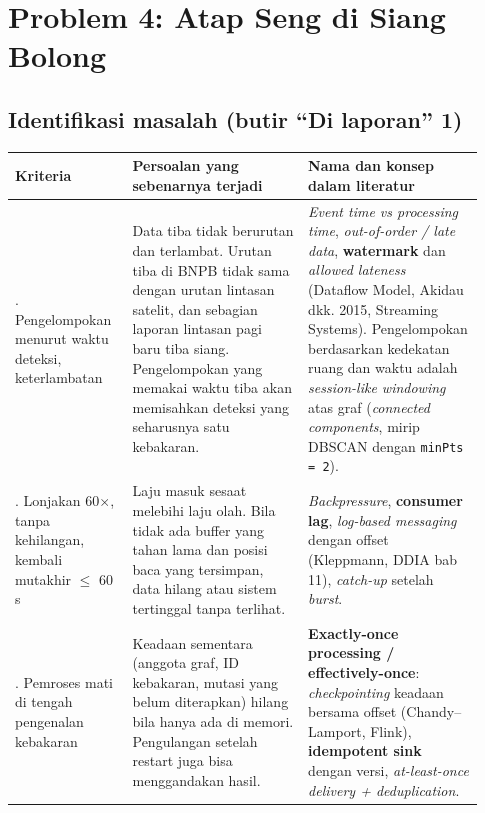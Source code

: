 \chapter{Problem 4: Atap Seng di Siang Bolong}

\section{Identifikasi masalah (butir ``Di laporan'' 1)}

{\small
\begin{longtable}{@{}>{\raggedright\arraybackslash}p{0.224\linewidth}>{\raggedright\arraybackslash}p{0.355\linewidth}>{\raggedright\arraybackslash}p{0.355\linewidth}@{}}
\toprule
\textbf{Kriteria} & \textbf{Persoalan yang sebenarnya terjadi} & \textbf{Nama dan konsep dalam literatur} \\
\midrule
\endhead
2. Pengelompokan menurut waktu deteksi, keterlambatan & Data tiba tidak berurutan dan terlambat. Urutan tiba di BNPB tidak sama dengan urutan lintasan satelit, dan sebagian laporan lintasan pagi baru tiba siang. Pengelompokan yang memakai waktu tiba akan memisahkan deteksi yang seharusnya satu kebakaran. & \emph{Event time vs processing time}, \emph{out-of-order / late data}, \textbf{watermark} dan \emph{allowed lateness} (Dataflow Model, Akidau dkk. 2015, Streaming Systems). Pengelompokan berdasarkan kedekatan ruang dan waktu adalah \emph{session-like windowing} atas graf (\emph{connected components}, mirip DBSCAN dengan \texttt{min\allowbreak{}Pts =\allowbreak{} 2}). \\
4. Lonjakan 60$\times$, tanpa kehilangan, kembali mutakhir $\le$ 60 s & Laju masuk sesaat melebihi laju olah. Bila tidak ada buffer yang tahan lama dan posisi baca yang tersimpan, data hilang atau sistem tertinggal tanpa terlihat. & \emph{Backpressure}, \textbf{consumer lag}, \emph{log-based messaging} dengan offset (Kleppmann, DDIA bab 11), \emph{catch-up} setelah \emph{burst}. \\
5. Pemroses mati di tengah pengenalan kebakaran & Keadaan sementara (anggota graf, ID kebakaran, mutasi yang belum diterapkan) hilang bila hanya ada di memori. Pengulangan setelah restart juga bisa menggandakan hasil. & \textbf{Exactly-once processing / effectively-once}: \emph{checkpointing} keadaan bersama offset (Chandy--Lamport, Flink), \textbf{idempotent sink} dengan versi, \emph{at-least-once delivery + deduplication}. \\
\bottomrule
\end{longtable}
}

